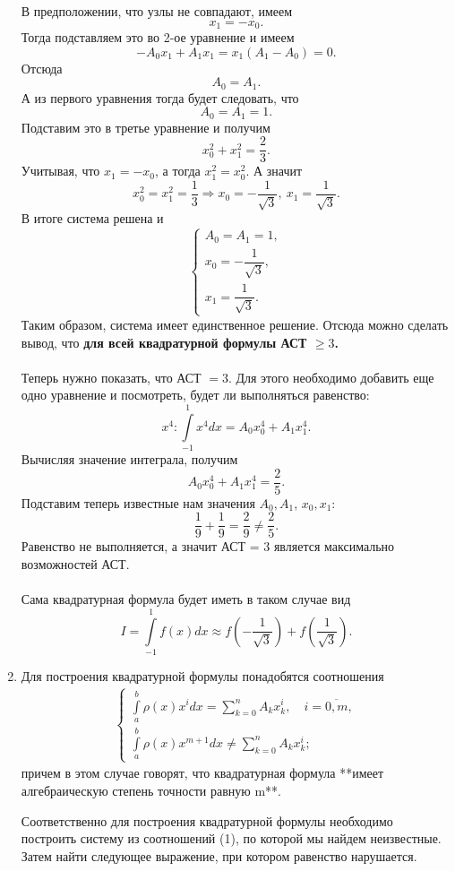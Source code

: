 \documentclass[a4paper, 12pt]{article}
\renewcommand{\geq}{\geqslant}
\begin{document}
\begin{enumerate}
		В предположении, что узлы не совпадают, имеем $$x_1 = -x_0.$$
		Тогда подставляем это во 2-ое уравнение и имеем 
		$$-A_0x_1 + A_1x_1 = x_1(A_1 - A_0) = 0.$$
		Отсюда $$A_0 = A_1.$$
		А из первого уравнения тогда будет следовать, что $$A_0 = A_1 = 1.$$
		Подставим это в третье уравнение и получим $$x_0^2 + x_1^2 = \dfrac23.$$
		Учитывая, что $x_1 = -x_0$, а тогда $x_1^2 = x_0^2$. А значит $$x_0^2 = x_1^2 = \dfrac{1}{3}\Rightarrow x_0 = -\dfrac{1}{\sqrt3},\ x_1 = \dfrac{1}{\sqrt3}.$$
		В итоге система решена и $$\begin{cases}
			A_0 = A_1 = 1,\\
			x_0 = -\dfrac{1}{\sqrt3},\\
			x_1 = \dfrac{1}{\sqrt3}.
		\end{cases}$$
		Таким образом, система имеет единственное решение. Отсюда можно сделать вывод, что \textbf{для всей квадратурной формулы АСТ $\geq 3$.}\\\\
		Теперь нужно показать, что АСТ $= 3$. Для этого необходимо добавить еще одно уравнение и посмотреть, будет ли выполняться равенство:
		$$x^4 : \int\limits_{-1}^1 x^4dx = A_0x_0^4 + A_1x_1^4.$$
		Вычисляя значение интеграла, получим $$A_0x_0^4 + A_1x_1^4 = \dfrac25.$$
		Подставим теперь известные нам значения $A_0,A_1$, $x_0,x_1$:
		$$\dfrac{1}{9} + \dfrac{1}{9} = \dfrac29\ne \dfrac25.$$ 
		Равенство не выполняется, а значит АСТ = 3 является максимально возможностей АСТ.\\\\
		Сама квадратурная формула будет иметь в таком случае вид
		$$I = \int\limits_{-1}^{1} f(x)dx \approx f\left(-\dfrac{1}{\sqrt3}\right) + f\left(\dfrac{1}{\sqrt3}\right).$$
		
		\newpage
		\item 
		\hypertarget{t3}{}
		Для построения квадратурной формулы понадобятся соотношения \begin{eqnarray}
			\begin{cases}
				\int\limits_a^b \rho(x) x^idx = \sum\limits_{k=0}^{n}A_kx^i_k,\quad i=\overline{0,m},\\
				\int\limits_a^b \rho(x) x^{m+1}dx \ne \sum\limits_{k=0}^{n}A_kx^i_k;
			\end{cases}
		\end{eqnarray}
		причем в этом случае говорят, что квадратурная формула **имеет алгебраическую степень точности равную m**.
		
		Соответственно для построения квадратурной формулы необходимо построить систему из соотношений (1), по которой мы найдем неизвестные. Затем найти следующее выражение, при котором равенство нарушается.
		

\end{enumerate}
\end{document}
